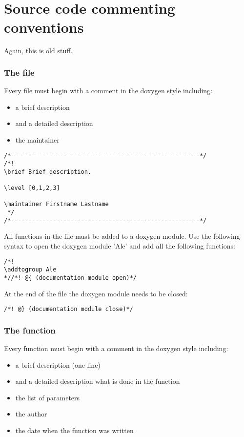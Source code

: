 \chapter{Source code commenting conventions}

Again, this is old stuff.

\subsection{The file}

Every file must begin with a comment in the doxygen style including: 

\begin{itemize}
\item a brief description
\item and a detailed description
\item the maintainer
\end{itemize}

\begin{verbatim}
/*------------------------------------------------------*/
/*!
\brief Brief description.

\level [0,1,2,3]

\maintainer Firstname Lastname
 */
/*------------------------------------------------------*/
\end{verbatim}

All functions in the file must be added to a doxygen module. Use the
following syntax to open the doxygen module 'Ale' and add all the
following functions:

\begin{verbatim}
/*!
\addtogroup Ale
*//*! @{ (documentation module open)*/
\end{verbatim}

 At the end of the file the doxygen module needs to be closed: 

\begin{verbatim}
/*! @} (documentation module close)*/
\end{verbatim}

\subsection{The function}

Every function must begin with a comment in the doxygen style including: 

\begin{itemize}
\item a brief description (one line)
\item and a detailed description what is done in the function
\item the list of parameters
\item the author
\item the date when the function was written
\end{itemize}


